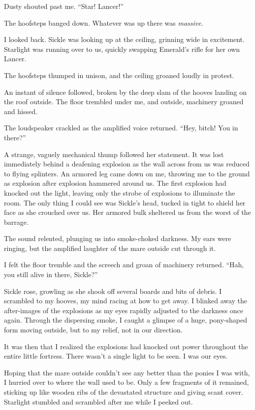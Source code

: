 Dusty shouted past me. “Star! Lancer!”

The hoofsteps banged down. Whatever was up there was \textit{massive}.

I looked back. Sickle was looking up at the ceiling, grinning wide in excitement. Starlight was running over to us, quickly swapping Emerald’s rifle for her own Lancer.

The hoofsteps thumped in unison, and the ceiling groaned loudly in protest.

An instant of silence followed, broken by the deep slam of the hooves landing on the roof outside. The floor trembled under me, and outside, machinery groaned and hissed.

The loudspeaker crackled as the amplified voice returned. “Hey, bitch! You in there?”

A strange, vaguely mechanical thump followed her statement. It was lost immediately behind a deafening explosion as the wall across from us was reduced to flying splinters. An armored leg came down on me, throwing me to the ground as explosion after explosion hammered around us. The first explosion had knocked out the light, leaving only the strobe of explosions to illuminate the room. The only thing I could see was Sickle’s head, tucked in tight to shield her face as she crouched over us. Her armored bulk sheltered us from the worst of the barrage.

The sound relented, plunging us into smoke-choked darkness. My ears were ringing, but the amplified laughter of the mare outside cut through it.

I felt the floor tremble and the screech and groan of machinery returned. “Hah, you still alive in there, Sickle?”

Sickle rose, growling as she shook off several boards and bits of debris. I scrambled to my hooves, my mind racing at how to get away. I blinked away the after-images of the explosions as my eyes rapidly adjusted to the darkness once again. Through the dispersing smoke, I caught a glimpse of a huge, pony-shaped form moving outside, but to my relief, not in our direction.

It was then that I realized the explosions had knocked out power throughout the entire little fortress. There wasn’t a single light to be seen. I was our eyes.

Hoping that the mare outside couldn’t see any better than the ponies I was with, I hurried over to where the wall used to be. Only a few fragments of it remained, sticking up like wooden ribs of the devastated structure and giving scant cover. Starlight stumbled and scrambled after me while I peeked out.


